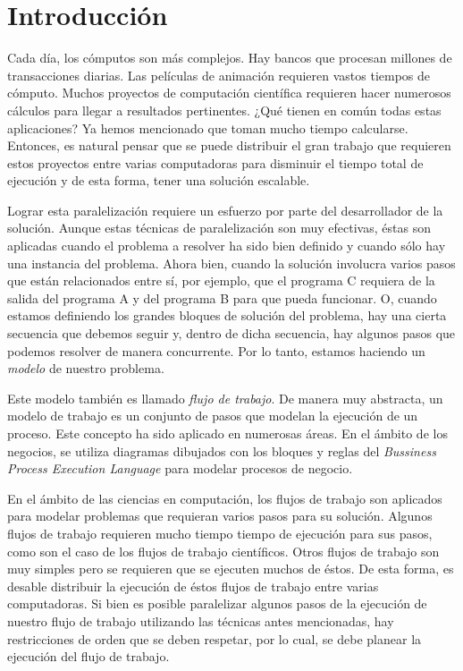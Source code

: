 \chapter{Introducción}
Cada día, los cómputos son más complejos. Hay bancos que procesan millones de transacciones diarias. Las películas de animación requieren vastos tiempos de cómputo. Muchos proyectos de computación científica requieren hacer numerosos cálculos para llegar a resultados pertinentes. ¿Qué tienen en común todas estas aplicaciones? Ya hemos mencionado que toman mucho tiempo calcularse. Entonces, es natural pensar que se puede distribuir el gran trabajo que requieren estos proyectos entre varias computadoras para disminuir el tiempo total de ejecución y de esta forma, tener una solución escalable. 

Lograr esta paralelización requiere un esfuerzo por parte del desarrollador de la solución. Aunque estas técnicas de paralelización son muy efectivas, éstas son aplicadas cuando el problema a resolver ha sido bien definido y cuando sólo hay una instancia del problema. Ahora bien, cuando la solución involucra varios pasos que están relacionados entre sí, por ejemplo, que el programa C requiera de la salida del programa A y del programa B para que pueda funcionar. O, cuando estamos definiendo los grandes bloques de solución del problema, hay una cierta secuencia que debemos seguir y, dentro de dicha secuencia, hay algunos pasos que podemos resolver de manera concurrente. Por lo tanto, estamos haciendo un \emph{modelo} de nuestro problema.

Este modelo también es llamado \emph{flujo de trabajo}. De manera muy abstracta, un modelo de trabajo es un conjunto de pasos que modelan la ejecución de un proceso. Este concepto ha sido aplicado en numerosas áreas. En el ámbito de los negocios, se utiliza diagramas dibujados con los bloques y reglas del \emph{Bussiness Process Execution Language} para modelar procesos de negocio.

En el ámbito de las ciencias en computación, los flujos de trabajo son aplicados para modelar problemas que requieran varios pasos para su solución. Algunos flujos de trabajo requieren mucho tiempo tiempo de ejecución para sus pasos, como son el caso de los flujos de trabajo científicos. Otros flujos de trabajo son muy simples pero  se requieren que se ejecuten muchos de éstos. De esta forma, es desable distribuir la ejecución de éstos flujos de trabajo entre varias computadoras. Si bien es posible paralelizar algunos pasos de la ejecución de nuestro flujo de trabajo utilizando las técnicas antes mencionadas, hay restricciones de orden que se deben respetar, por lo cual, se debe planear la ejecución del flujo de trabajo.

